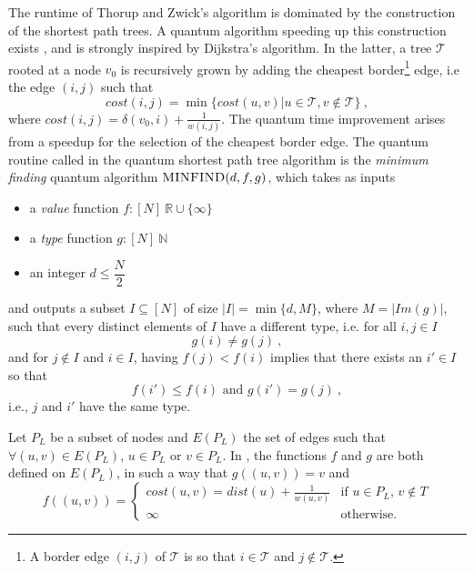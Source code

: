 The runtime of Thorup and Zwick's algorithm is dominated by the construction of the shortest path trees.  A quantum algorithm speeding up this construction exists \cite{Durr_Heiligman_2006}, and is strongly inspired by Dijkstra's algorithm. 
In the latter, a tree $\mathcal{T}$ rooted at a node $v_0$ is recursively grown by adding the cheapest border\footnote{A border edge $(i,j)$ of $\mathcal T$ is so that $i\in \mathcal T$ and $j \notin \mathcal T$.} edge, i.e the edge $(i,j)$ such that 
\begin{equation*}
    cost(i,j)= \min\{ cost(u,v) | u\in\mathcal{T},v\notin \mathcal{T}\} \ ,
\end{equation*}
where $cost(i,j) = \delta(v_0,i) + \frac{1}{w(i,j)}$. The quantum time improvement arises from a speedup for the selection of the cheapest border edge. 
The quantum routine called in the quantum shortest path tree algorithm is the \textit{minimum finding} quantum algorithm 
$\textsc{MINFIND}(d,f,g)$, which takes as inputs 
\begin{itemize}%
    \item a \textit{value} function $f : [N] \> \mathbb{R} \cup \{\infty\}$
    \item a \textit{type} function $g : [N] \> \mathbb{N}$
    \item an integer $d \leq \dfrac N2$
\end{itemize}
and outputs a subset $I \subseteq [N]$ of size $|I| = \min\{d,M\}$, where $M = |Im(g)|$, such that
every distinct elements of $I$ have a different type, i.e. for all $i,j \in I$ $$g(i) \neq g(j)\ ,$$
and for $ j\notin I$ and $i \in I$, having $f(j)<f(i)$ implies that there exists an $ i' \in I$ so that 
$$ f(i')\leq f(i) \text{ and } g(i')= g(j)\ ,$$
i.e., $j$ and $i'$ have the same type.

Let $P_L$ be a subset of nodes and $E(P_L)$ the set of edges such that $\forall (u,v) \in E(P_L)$, $u \in P_L \text{ or } v \in P_L$. 
In , %
the functions $f$ and $g$ are both defined on $E(P_L)$, in such a way that $g((u,v)) = v$ and 
\begin{equation*}
    f((u,v)) = \begin{cases}
        cost(u,v)=dist(u) + \frac{1}{w(u,v)} & \text{if } u\in P_L,\, v\notin T \\
        \infty & \text{otherwise.}
    \end{cases}
\end{equation*}

